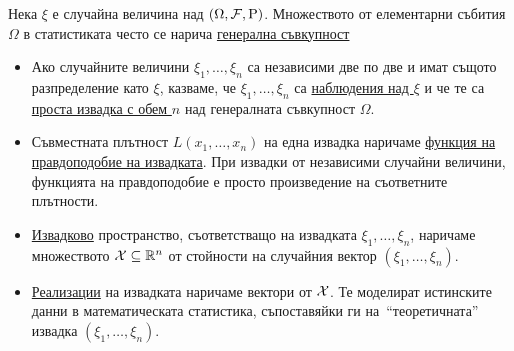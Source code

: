 \documentclass[numbers=endperiod, DIV=15, bibliography=totocnumbered]{scrartcl}
\begin{document}
\begin{definition}[Извадки]
  Нека $\xi$ е случайна величина над $(\Omega, \mathcal{F}, \operatorname{P})$. Множеството от елементарни събития $\Omega$ в статистиката често се нарича \uline{генерална съвкупност}

  \begin{itemize}
    \item Ако случайните величини $\xi_1, \ldots, \xi_n$ са независими две по две и имат същото разпределение като $\xi$, казваме, че $\xi_1, \ldots, \xi_n$ са \uline{наблюдения над $\xi$} и че те са \uline{проста извадка с обем $n$} над генералната съвкупност $\Omega$.
    \item Съвместната плътност $L(x_1, \ldots, x_n)$ на една извадка наричаме \uline{функция на правдоподобие на извадката}. При извадки от независими случайни величини, функцията на правдоподобие е просто произведение на съответните плътности.
    \item \uline{Извадково} пространство, съответстващо на извадката $\xi_1, \ldots, \xi_n$, наричаме множеството $\mathcal{X} \subseteq \mathbb{R}^n$ от стойности на случайния вектор $(\xi_1, \ldots, \xi_n)$.
    \item \uline{Реализации} на извадката наричаме вектори от $\mathcal{X}$. Те моделират истинските данни в математическата статистика, съпоставяйки ги на~\enquote{теоретичната} извадка $(\xi_1, \ldots, \xi_n)$.
  \end{itemize}
\end{definition}
\end{document}
